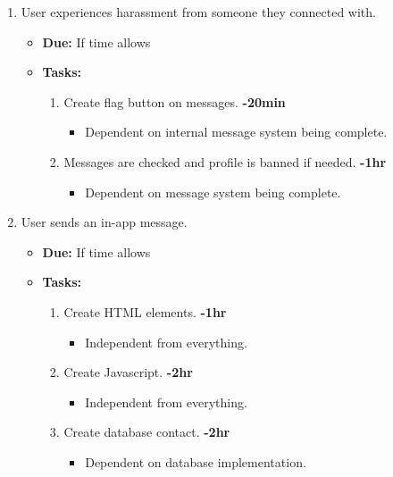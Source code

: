 \documentclass[12pt]{article}
\begin{document}
\begin{enumerate}
    \item User experiences harassment from someone they connected with.
      \begin{itemize}
        \item \textbf{Due:} If time allows
        \item \textbf{Tasks:}
          \begin{enumerate}
            \item Create flag button on messages. \textbf{-20min}
              \begin{itemize}
                \item Dependent on internal message system being complete.
              \end{itemize}
            \item Messages are checked and profile is banned if needed. \textbf{-1hr}
              \begin{itemize}
                \item Dependent on message system being complete.
              \end{itemize}
          \end{enumerate}
      \end{itemize}

    \item User sends an in-app message.
      \begin{itemize}
        \item \textbf{Due:} If time allows
        \item \textbf{Tasks:}
          \begin{enumerate}
            \item Create HTML elements. \textbf{-1hr}
              \begin{itemize}
                \item Independent from everything.
              \end{itemize}
            \item Create Javascript. \textbf{-2hr}
              \begin{itemize}
                \item Independent from everything.
              \end{itemize}
            \item Create database contact. \textbf{-2hr}
              \begin{itemize}
                \item Dependent on database implementation.
              \end{itemize}
          \end{enumerate}
      \end{itemize}


\end{enumerate}
\end{document}
